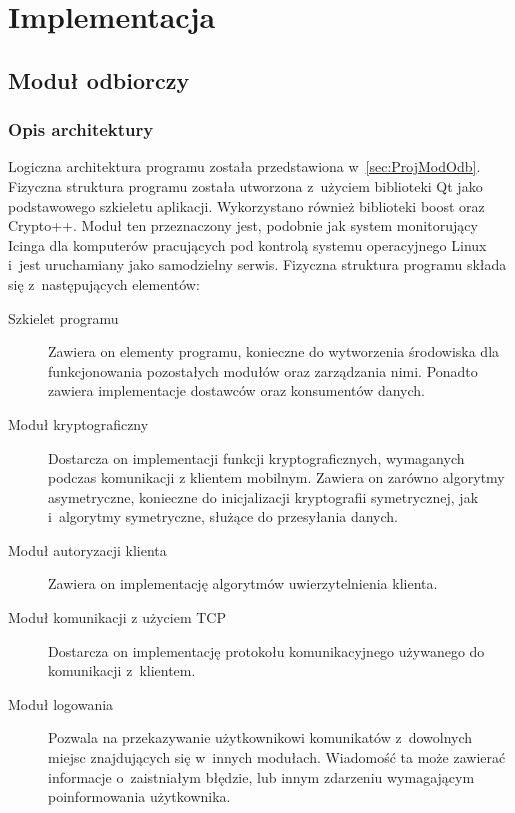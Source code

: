 \chapter{Implementacja}
\label{chap:Implementacja}

\section[Moduł odbiorczy][Moduł odbiorczy]{Moduł odbiorczy}

\subsection[Opis architektury][Opis architektury]{Opis architektury}

Logiczna architektura programu została przedstawiona
w~\ref{sec:ProjModOdb}. Fizyczna struktura programu została utworzona
z~użyciem biblioteki Qt jako podstawowego szkieletu
aplikacji. Wykorzystano również biblioteki boost oraz Crypto++. Moduł
ten przeznaczony jest, podobnie jak system monitorujący Icinga dla
komputerów pracujących pod kontrolą systemu operacyjnego Linux i~jest
uruchamiany jako samodzielny serwis. Fizyczna struktura programu
składa się z~następujących elementów:

\begin{description}
\item[Szkielet programu] Zawiera on elementy programu, konieczne do
  wytworzenia środowiska dla funkcjonowania pozostałych modułów oraz
  zarządzania nimi. Ponadto zawiera implementacje dostawców oraz
  konsumentów danych.
\item[Moduł kryptograficzny] Dostarcza on implementacji funkcji
  kryptograficznych, wymaganych podczas komunikacji z klientem
  mobilnym. Zawiera on zarówno algorytmy asymetryczne, konieczne do
  inicjalizacji kryptografii symetrycznej, jak i~algorytmy symetryczne,
  służące do przesyłania danych.
\item[Moduł autoryzacji klienta] Zawiera on implementację algorytmów
  uwierzytelnienia klienta.
\item[Moduł komunikacji z użyciem TCP] Dostarcza on implementację
  protokołu komunikacyjnego używanego do komunikacji z~klientem.
\item[Moduł logowania] Pozwala na przekazywanie użytkownikowi
  komunikatów z~dowolnych miejsc znajdujących się w~innych
  modułach. Wiadomość ta może zawierać informacje o~zaistniałym
  błędzie, lub innym zdarzeniu wymagającym poinformowania użytkownika.
\end{description}

